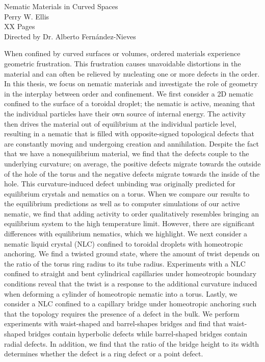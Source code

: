 \documentclass[11pt]{article}   %
\begin{document}
\onehalfspacing
\begin{centering}
Nematic Materials in Curved Spaces \\[11 pt]

Perry W. Ellis \\[11 pt]

XX Pages \\[11 pt]

Directed by Dr. Alberto Fern\'andez-Nieves \\[22 pt]
\end{centering}
When confined by curved surfaces or volumes, ordered materials experience geometric frustration.
This frustration causes unavoidable distortions in the material and can often be relieved by nucleating one or more defects in the order.
In this thesis, we focus on nematic materials and investigate the role of geometry in the interplay between order and confinement.
We first consider a 2D nematic confined to the surface of a toroidal droplet; the nematic is active, meaning that the individual particles have their own source of internal energy.
The activity then drives the material out of equilibrium at the individual particle level, resulting in a nematic that is filled with opposite-signed topological defects that are constantly moving and undergoing creation and annihilation.
Despite the fact that we have a nonequilibrium material, we find that the defects couple to the underlying curvature; on average, the positive defects migrate towards the outside of the hole of the torus and the negative defects migrate towards the inside of the hole.
This curvature-induced defect unbinding was originally predicted for equilibrium crystals and nematics on a torus.
When we compare our results to the equilibrium predictions as well as to computer simulations of our active nematic, we find that adding activity to order qualitatively resembles bringing an equilibrium system to the high temperature limit.
However, there are significant differences with equilibrium nematics, which we highlight.
We next consider a nematic liquid crystal (NLC) confined to toroidal droplets with homeotropic anchoring.
We find a twisted ground state, where the amount of twist depends on the ratio of the torus ring radius to its tube radius.
Experiments with a NLC confined to straight and bent cylindrical capillaries under homeotropic boundary conditions reveal that the twist is a response to the additional curvature induced when deforming a cylinder of homeotropic nematic into a torus.
Lastly, we consider a NLC confined to a capillary bridge under homeotropic anchoring such that the topology requires the presence of a defect in the bulk.
We perform experiments with waist-shaped and barrel-shapes bridges and find that waist-shaped bridges contain hyperbolic defects while barrel-shaped bridges contain radial defects.
In addition, we find that the ratio of the bridge height to its width determines whether the defect is a ring defect or a point defect.
\end{document}
